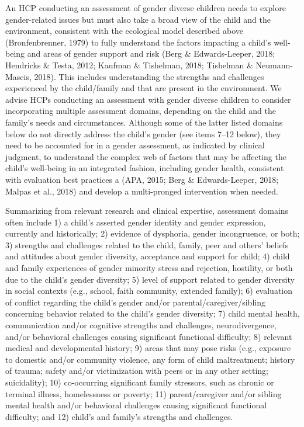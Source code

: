 \documentclass[
]{book}
\begin{document}
An HCP conducting an assessment of gender
diverse children needs to explore gender-related
issues but must also take a broad view of the
child and the environment, consistent with the
ecological model described above
(Bronfenbrenner, 1979) to fully understand the
factors impacting a child's well-being and areas
of gender support and risk (Berg \&
Edwards-Leeper, 2018; Hendricks \& Testa, 2012;
Kaufman \& Tishelman, 2018; Tishelman \&
Neumann-Mascis, 2018). This includes understanding the strengths and challenges experienced by the child/family and that are present
in the environment. We advise HCPs conducting
an assessment with gender diverse children to
consider incorporating multiple assessment
domains, depending on the child and the family's needs and circumstances. Although some
of the latter listed domains below do not directly
address the child's gender (see items 7--12
below), they need to be accounted for in a gender assessment, as indicated by clinical judgment, to understand the complex web of factors
that may be affecting the child's well-being in
an integrated fashion, including gender health,
consistent with evaluation best practices a (APA,
2015; Berg \& Edwards-Leeper, 2018; Malpas
et al., 2018) and develop a multi-pronged intervention when needed.

Summarizing from relevant research and clinical
expertise, assessment domains often include 1) a
child's asserted gender identity and gender expression, currently and historically; 2) evidence of
dysphoria, gender incongruence, or both; 3)
strengths and challenges related to the child, family, peer and others' beliefs and attitudes about
gender diversity, acceptance and support for child;
4) child and family experiences of gender minority
stress and rejection, hostility, or both due to the
child's gender diversity; 5) level of support related
to gender diversity in social contexts (e.g., school,
faith community, extended family); 6) evaluation
of conflict regarding the child's gender and/or
parental/caregiver/sibling concerning behavior
related to the child's gender diversity; 7) child
mental health, communication and/or cognitive
strengths and challenges, neurodivergence, and/or
behavioral challenges causing significant functional
difficulty; 8) relevant medical and developmental
history; 9) areas that may pose risks (e.g., exposure
to domestic and/or community violence, any form
of child maltreatment; history of trauma; safety
and/or victimization with peers or in any other
setting; suicidality); 10) co-occurring significant
family stressors, such as chronic or terminal illness, homelessness or poverty; 11) parent/caregiver
and/or sibling mental health and/or behavioral
challenges causing significant functional difficulty;
and 12) child's and family's strengths and challenges.
\end{document}
